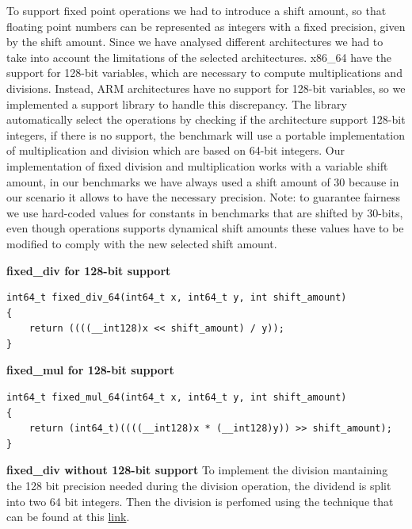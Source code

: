 To support fixed point operations we had to introduce a shift amount, so that floating point numbers can be represented as integers with a fixed precision, given by the shift amount.\newline
Since we have analysed different architectures we had to take into account the limitations of the selected architectures.
x86\_64 have the support for 128-bit variables, which are necessary to compute multiplications and divisions. Instead, ARM architectures have no support for 128-bit variables, so we implemented a support library to handle this discrepancy.
The library automatically select the operations by checking if the architecture support 128-bit integers, if there is no support, the benchmark will use a portable implementation of multiplication and division which are based on 64-bit integers.\newline
Our implementation of fixed division and multiplication works with a variable shift amount, in our benchmarks we have always used a shift amount of 30 because in our scenario it allows to have the necessary precision.\newline
Note: to guarantee fairness we use hard-coded values for constants in benchmarks that are shifted by 30-bits, even though operations supports dynamical shift amounts these values have to be modified to comply with the new selected shift amount.\newline

\textbf{fixed\_div for 128-bit support}

\begin{lstlisting}
int64_t fixed_div_64(int64_t x, int64_t y, int shift_amount)
{
    return ((((__int128)x << shift_amount) / y));
}
\end{lstlisting}

\textbf{fixed\_mul for 128-bit support}

\begin{lstlisting}
int64_t fixed_mul_64(int64_t x, int64_t y, int shift_amount)
{
	return (int64_t)((((__int128)x * (__int128)y)) >> shift_amount);
}
\end{lstlisting}

\textbf{fixed\_div without 128-bit support}\newline
To implement the division mantaining the 128 bit precision needed during the division operation,  the dividend is split into two 64 bit integers. Then the division is perfomed using the technique that can be found at this \href{https://codereview.stackexchange.com/questions/67962/mostly-portable-128-by-64-bit-division}{link}.\newline

